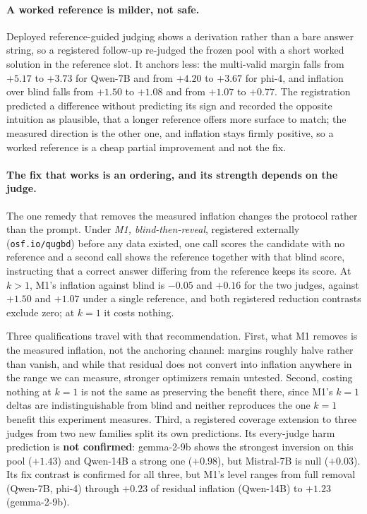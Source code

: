 \documentclass[11pt]{article}
\begin{document}
\paragraph{A worked reference is milder, not safe.}
Deployed reference-guided judging shows a derivation rather than a bare answer string, so a registered follow-up re-judged the frozen pool with a short worked solution in the reference slot.
It anchors less: the multi-valid margin falls from $+5.17$ to $+3.73$ for Qwen-7B and from $+4.20$ to $+3.67$ for phi-4, and inflation over blind falls from $+1.50$ to $+1.08$ and from $+1.07$ to $+0.77$.
The registration predicted a difference without predicting its sign and recorded the opposite intuition as plausible, that a longer reference offers more surface to match; the measured direction is the other one, and inflation stays firmly positive, so a worked reference is a cheap partial improvement and not the fix.

\paragraph{The fix that works is an ordering, and its strength depends on the judge.}
The one remedy that removes the measured inflation changes the protocol rather than the prompt.
Under \emph{M1, blind-then-reveal}, registered externally (\texttt{osf.io/qugbd}) before any data existed, one call scores the candidate with no reference and a second call shows the reference together with that blind score, instructing that a correct answer differing from the reference keeps its score.
At $k>1$, M1's inflation against blind is $-0.05$ and $+0.16$ for the two judges, against $+1.50$ and $+1.07$ under a single reference, and both registered reduction contrasts exclude zero; at $k{=}1$ it costs nothing.

Three qualifications travel with that recommendation.
First, what M1 removes is the measured inflation, not the anchoring channel: margins roughly halve rather than vanish, and while that residual does not convert into inflation anywhere in the range we can measure, stronger optimizers remain untested.
Second, costing nothing at $k{=}1$ is not the same as preserving the benefit there, since M1's $k{=}1$ deltas are indistinguishable from blind and neither reproduces the one $k{=}1$ benefit this experiment measures.
Third, a registered coverage extension to three judges from two new families split its own predictions.
Its every-judge harm prediction is \textbf{not confirmed}: gemma-2-9b shows the strongest inversion on this pool ($+1.43$) and Qwen-14B a strong one ($+0.98$), but Mistral-7B is null ($+0.03$).
Its fix contrast is confirmed for all three, but M1's level ranges from full removal (Qwen-7B, phi-4) through $+0.23$ of residual inflation (Qwen-14B) to $+1.23$ (gemma-2-9b).
\end{document}
